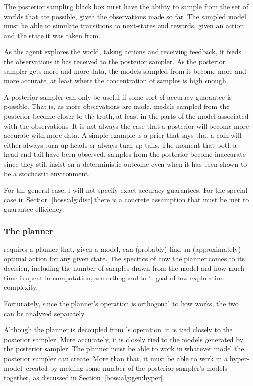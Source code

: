 The posterior sampling black box must have the ability to sample from the set of worlds that are possible, given the observations made so far. The sampled model must be able to simulate transitions to next-states and rewards, given an action and the state it was taken from.

As the agent explores the world, taking actions and receiving feedback, it feeds the observations it has received to the posterior sampler. As the posterior sampler gets more and more data, the models sampled from it become more and more accurate, at least where the concentration of samples is high enough.

A posterior sampler can only be useful if some sort of accuracy guarantee is possible. That is, as more observations are made, models sampled from the posterior become closer to the truth, at least in the parts of the model associated with the observations. It is not always the case that a posterior will become more accurate with more data. A simple example is a prior that says that a coin will either always turn up heads or always turn up tails. The moment that both a head and tail have been observed, samples from the posterior become inaccurate since they still insist on a deterministic outcome even when it has been shown to be a stochastic environment.

For the general case, I will not specify exact accuracy guarantees. For the special case in Section~\ref{boss:alg:disc} there is a concrete assumption that must be met to guarantee efficiency.

\subsubsection{The planner}

 requires a planner that, given a model, can (probably) find an (approximately) optimal action for any given state. The specifics of how the planner comes to its decision, including the number of samples drawn from the model and how much time is spent in computation, are orthogonal to 's goal of low exploration complexity.

Fortunately, since the planner's operation is orthogonal to how  works, the two can be analyzed separately.

Although the planner is decoupled from 's operation, it is tied closely to the posterior sampler. More accurately, it is closely tied to the models generated by the posterior sampler. The planner must be able to work in whatever model the posterior sampler can create. More than that, it must be able to work in a hyper-model, created by melding some number of the posterior sampler's models together, as discussed in Section~\ref{boss:alg:gen:hyper}.

